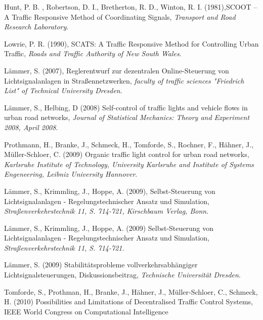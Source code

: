 \begin{thebibliography}{1}

    
    Hunt, P. B. , Robertson, D. I., Bretherton, R. D., Winton, R. I. (1981),SCOOT – A Traffic Responsive
    Method of Coordinating Signals, \emph{Transport and Road Research Laboratory}.
    
    Lowrie, P. R. (1990), SCATS: A Traffic Responsive Method for Controlling Urban Traffic, \emph{Roads and
    Traffic Authority of New South Wales}.

    L\"ammer, S. (2007), Reglerentwurf zur dezentralen Online-Steuerung von Lichtsignalanlagen in Straßennetzwerken, \emph{faculty of traffic sciences "Friedrich List" of Technical University Dresden}.
    
    L\"ammer, S., Helbing, D (2008) Self-control of traffic lights and vehicle flows in urban road networks, \emph{ Journal of Statistical Mechanics: Theory and Experiment 2008, April 2008}.
    
    Prothmann, H., Branke, J., Schmeck, H., Tomforde, S., Rochner, F., H\"ahner, J., Müller-Schloer, C. (2009) Organic traffic light control for urban road networks, \emph{Karlsruhe Institute of Technology, University Karlsruhe and Institute of Systems Engeneering, Leibniz University Hannover}.
    
    L\"ammer, S., Krimmling, J., Hoppe, A. (2009), Selbst-Steuerung von Lichtsignalanlagen - Regelungstechnischer Ansatz und Simulation, \emph{Stra{\ss}enverkehrstechnik 11, S. 714-721, Kirschbaum Verlag, Bonn}.
    
     Lämmer, S., Krimmling, J., Hoppe, A. (2009) Selbst-Steuerung von Lichtsignalanlagen - Regelungstechnischer Ansatz und Simulation, \emph{Straßenverkehrstechnik 11, S. 714-721.}
    
    Lämmer, S. (2009) Stabilit\"atsprobleme vollverkehrsabhängiger Lichtsignalsteuerungen, Diskussionsbeitrag, \emph{Technische Universität Dresden}.
    
    Tomforde, S., Prothman, H., Branke, J., H\"ahner, J., M\"uller-Schloer, C., Schmeck, H. (2010) Possibilities and Limitations of Decentralised Traffic Control Systems, IEEE World Congress on Computational Intelligence
    

\end{thebibliography}
